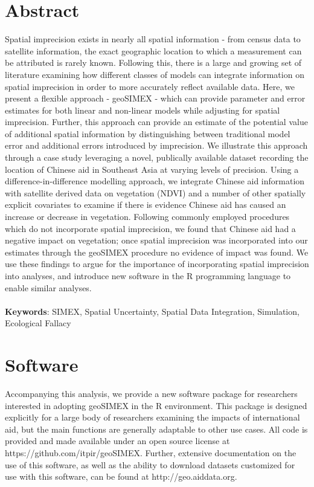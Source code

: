 \section{Abstract}
Spatial imprecision exists in nearly all spatial information - from census data to satellite information, the exact geographic location to which a measurement can be attributed is rarely known.
Following this, there is a large and growing set of literature examining how different classes of models can integrate information on spatial imprecision in order to more accurately reflect available data.
Here, we present a flexible approach - geoSIMEX - which can provide parameter and error estimates for both linear and non-linear models while adjusting for spatial imprecision.
Further, this approach can provide an estimate of the potential value of additional spatial information by distinguishing between traditional model error and additional errors introduced by imprecision.
We illustrate this approach through a case study leveraging a novel, publically available dataset recording the location of Chinese aid in Southeast Asia at varying levels of precision.
Using a difference-in-difference modelling approach, we integrate Chinese aid information with satellite derived data on vegetation (NDVI) and a number of other spatially explicit covariates to examine if there is evidence Chinese aid has caused an increase or decrease in vegetation.
Following commonly employed procedures which do not incorporate spatial imprecision, we found that Chinese aid had a negative impact on vegetation; once spatial imprecision was incorporated into our estimates through the geoSIMEX procedure no evidence of impact was found.
We use these findings to argue for the importance of incorporating spatial imprecision into analyses, and introduce new software in the R programming language to enable similar analyses. \\
\\
\textbf{Keywords}: SIMEX, Spatial Uncertainty, Spatial Data Integration, Simulation, Ecological Fallacy\\

\newpage
\section{Software}
Accompanying this analysis, we provide a new software package for researchers interested in adopting geoSIMEX in the R environment.
This package is designed explicitly for a large body of researchers examining the impacts of international aid, but the main functions are generally adaptable to other use cases.
All code is provided and made available under an open source license at https://github.com/itpir/geoSIMEX.
Further, extensive documentation on the use of this software, as well as the ability to download datasets customized for use with this software, can be found at http://geo.aiddata.org.
\newpage

